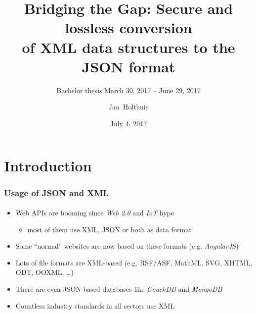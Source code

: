 \documentclass[
    alternativetitlepage=alternativ,
    cornerlogo=hgi_nds_logo2,
    sectionoverview,
]{rubpresentation}
\title[XML/JSON conversions]
{Bridging the Gap: Secure and lossless conversion\\ of XML data structures to the JSON format}
\subtitle{\small Bachelor thesis \hspace{3mm}{\scriptsize $\blacksquare$}\hspace{3mm} March 30, 2017 -- June 29, 2017}
\author[Holthuis]{Jan~Holthuis}
\institute[Advisors]
{%
Advisors: Dennis Felsch \& Paul Rösler
}
\date{July 4, 2017}
\begin{document}
\frame[plain]{\titlepage}



\section{Introduction}

\begin{frame}
    \frametitle{Usage of JSON and XML}
    \framesubtitle{}
    \begin{itemize}
        \item{} Web APIs are booming since \emph{Web 2.0} and \emph{IoT} hype
            \begin{itemize}
                \item{} most of them use XML, JSON or both as data format
            \end{itemize}
        \item{} Some \enquote{normal} websites are now based on these formats (e.g. \emph{AngularJS})\\
        \item{} Lots of file formats are XML-based (e.g. RSF/ASF, MathML, SVG, XHTML, ODT, OOXML, \ldots{})\\
        \item{} There are even JSON-based databases like \emph{CouchDB} and \emph{MongoDB}\\
        \item{} Countless industry standards in all sectors use XML
    \end{itemize}
\end{frame}
\end{document}
